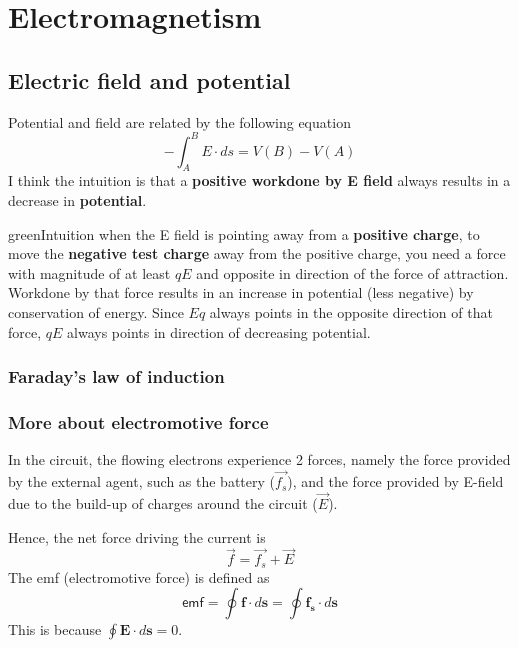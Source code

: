 \chapter{Electromagnetism}

\section{Electric field and potential}
Potential and field are related by the following equation
\begin{equation}
    -\int_A^B E \cdot ds = V(B)-V(A)
\end{equation}
I think the intuition is that a \textbf{positive workdone by E field} always results in a decrease in \textbf{potential}.

\begin{mybox}{green}{Intuition}
    when the E field is pointing away from a \textbf{positive charge}, to move the \textbf{negative test charge} away from the positive charge, you need a force with magnitude of at least $qE$ and opposite in direction of the force of attraction. Workdone by that force results in an increase in potential (less negative) by conservation of energy. Since $Eq$ always points in the opposite direction of that force, $qE$ always points in direction of decreasing potential.
\end{mybox}
\subsection{Faraday's law of induction}
\subsection{More about electromotive force}

In the circuit, the flowing electrons experience 2 forces, namely the force provided by the external agent, such as the battery ($\vec{f_s}$), and the force provided by E-field due to the build-up of charges around the circuit ($\vec{E}$).

Hence, the net force driving the current is
\begin{equation}
    \vec{f}=\vec{f_s}+\vec{E}
\end{equation}
The emf (electromotive force) is defined as
\begin{equation}
    \textsf{emf}=\oint \mathbf{f} \cdot d\mathbf{s}=\oint \mathbf{f_s} \cdot d\mathbf{s}
\end{equation}
This is because $\oint \mathbf{E} \cdot d\mathbf{s}=0$.


